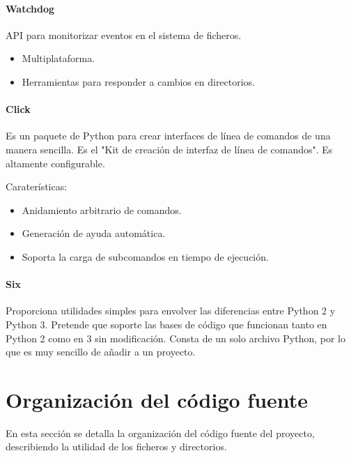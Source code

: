 \paragraph{Watchdog}

API para monitorizar eventos en el sistema de ficheros.

\begin{itemize}
    \item Multiplataforma.
    \item Herramientas para responder a cambios en directorios.
\end{itemize}

\paragraph{Click}

Es un paquete de Python para crear interfaces de línea de comandos de una manera
sencilla. Es el "Kit de creación de interfaz de
línea de comandos". Es altamente configurable.

Caraterísticas:

\begin{itemize}
    \item Anidamiento arbitrario de comandos.
    \item Generación de ayuda automática.
    \item Soporta la carga de subcomandos en tiempo de ejecución.
\end{itemize}

\paragraph{Six}

Proporciona utilidades simples para envolver las diferencias entre Python 2 y Python 3. Pretende
que soporte las bases de código que funcionan tanto en Python 2 como en 3 sin modificación.
Consta de un solo archivo Python, por lo que es muy sencillo de añadir a un proyecto.


\section{Organización del código fuente}

En esta sección se detalla la organización del código fuente del proyecto,
describiendo la utilidad de los ficheros y directorios.


